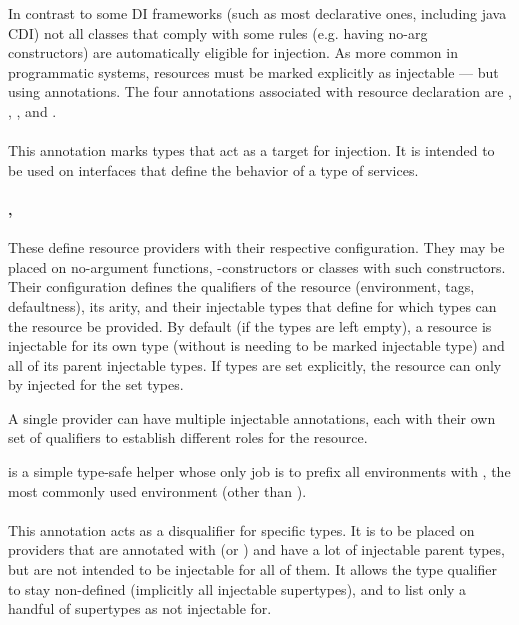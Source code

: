 	In contrast to some DI frameworks (such as most declarative ones, including java CDI) not all classes that comply with some rules (e.g. having no-arg constructors) are automatically eligible for injection. As more common in programmatic systems, resources must be marked explicitly as injectable --- but using annotations.
	The four annotations associated with resource declaration are , , , and .

		\paragraph{} This annotation marks types that act as a target for injection. It is intended to be used on interfaces that define the behavior of a type of services.
		
		\paragraph{, } These define resource providers with their respective configuration. They may be placed on no-argument functions, -constructors or classes with such constructors. Their configuration defines the qualifiers of the resource (environment, tags, defaultness), its arity, and their injectable types that define for which types can the resource be provided. By default (if the types are left empty), a resource is injectable for its own type (without is needing to be marked injectable type) and all of its parent injectable types. If types are set explicitly, the resource can only by injected for the set types.
		
		A single provider can have multiple injectable annotations, each with their own set of qualifiers to establish different roles for the resource.
		
		 is a simple type-safe helper whose only job is to prefix all environments with , the most commonly used environment (other than ).

		\paragraph{} This annotation	acts as a disqualifier for specific types. It is to be placed on providers that are annotated with  (or ) and have a lot of injectable parent types, but are not intended to be injectable for all of them. It allows the type qualifier to stay non-defined (implicitly all injectable supertypes), and to list only a handful of supertypes as not injectable for.

